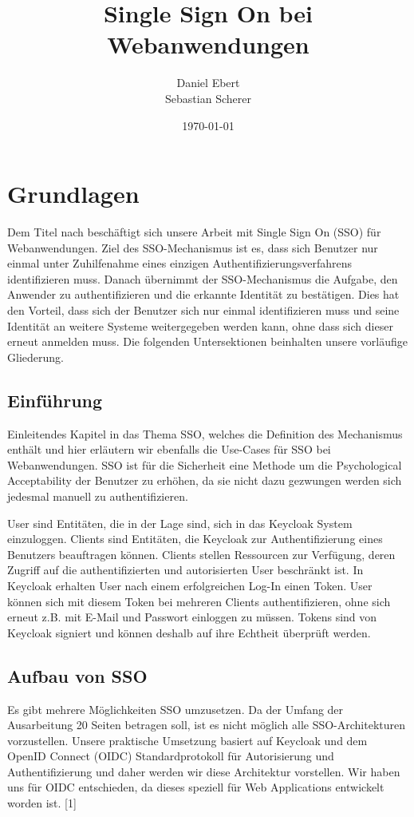 \documentclass[12pt]{article}
\title{Single Sign On bei Webanwendungen}
\author{Daniel Ebert \\
	Sebastian Scherer}
\date{\today}
\begin{document}
\maketitle
	
\section{Grundlagen}
Dem Titel nach beschäftigt sich unsere Arbeit mit Single Sign On (SSO) für Webanwendungen.
Ziel des SSO-Mechanismus ist es, dass sich Benutzer nur einmal unter Zuhilfenahme eines einzigen Authentifizierungsverfahrens identifizieren muss.
Danach übernimmt der SSO-Mechanismus die Aufgabe, den Anwender zu authentifizieren und die erkannte Identität zu bestätigen. Dies hat den Vorteil, dass sich der Benutzer sich nur einmal identifizieren muss und seine Identität an weitere Systeme weitergegeben werden kann, ohne dass sich dieser erneut anmelden muss.
Die folgenden Untersektionen beinhalten unsere vorläufige Gliederung.

\subsection{Einführung}	
Einleitendes Kapitel in das Thema SSO, welches die Definition des Mechanismus enthält und hier erläutern wir ebenfalls die Use-Cases für SSO bei Webanwendungen. SSO ist für die Sicherheit eine Methode um die Psychological Acceptability der Benutzer zu erhöhen, da sie nicht dazu gezwungen werden sich jedesmal manuell zu authentifizieren.

User sind Entitäten, die in der Lage sind, sich in das Keycloak System einzuloggen. Clients sind Entitäten, die Keycloak zur Authentifizierung eines Benutzers beauftragen können. Clients stellen Ressourcen zur Verfügung, deren Zugriff auf die authentifizierten und autorisierten User beschränkt ist. In Keycloak erhalten User nach einem erfolgreichen Log-In einen Token. User können sich mit diesem Token bei mehreren Clients authentifizieren, ohne sich erneut z.B. mit E-Mail und Passwort einloggen zu müssen. Tokens sind von Keycloak signiert und können deshalb auf ihre Echtheit überprüft werden.
	
\subsection{Aufbau von SSO}	
Es gibt mehrere Möglichkeiten SSO umzusetzen. Da der Umfang der Ausarbeitung 20 Seiten betragen soll, ist es nicht möglich alle SSO-Architekturen vorzustellen. Unsere praktische Umsetzung basiert auf Keycloak und dem OpenID Connect (OIDC) Standardprotokoll für Autorisierung und Authentifizierung und daher werden wir diese Architektur vorstellen. Wir haben uns für OIDC entschieden, da dieses speziell für Web Applications entwickelt worden ist. [1]
\end{document}
